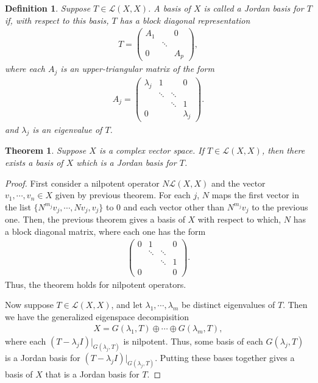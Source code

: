 \documentclass[10pt]{book}
\newtheorem{definition}{Definition}[chapter]
\newtheorem{theorem}{Theorem}[chapter]
\theoremstyle{definition}
\numberwithin{equation}{chapter}
\begin{document}
\medskip

\begin{definition}
Suppose $T\in\mathcal{L}(X,X)$. A basis of $X$ is called a Jordan basis for $T$ if, with respect to this basis, $T$ has a block diagonal representation
\begin{align*}
    T = \begin{pmatrix}
    A_1 &  & 0 \\
     & \ddots &  \\
    0 &  & A_p 
    \end{pmatrix},
\end{align*}
where each $A_j$ is an upper-triangular matrix of the form
\begin{align*}
    A_j = \begin{pmatrix}
    \lambda_j & 1 & & 0 \\
     & \ddots &  \ddots & \\
     &  & \ddots & 1 \\
    0 & & & \lambda_j
    \end{pmatrix}.
\end{align*}
and $\lambda_j$ is an eigenvalue of $T$.
\end{definition}

\medskip

\begin{theorem}
Suppose $X$ is a complex vector space. If $T\in\mathcal{L}(X,X)$, then there exists a basis of $X$ which is a Jordan basis for $T$.
\end{theorem}
\begin{proof}
First consider a nilpotent operator $N\mathcal{L}(X,X)$ and the vector $v_1,\cdots,v_n \in X$ given by previous theorem. For each $j$, $N$ maps the first vector in the list $\{N^{m_j}v_j, \cdots, Nv_j,v_j\}$ to $0$ and each vector other than $N^{m_j}v_j$ to the previous one. Then, the previous theorem gives a basis of $X$ with respect to which, $N$ has a block diagonal matrix, where each one has the form 
\begin{align*}
    \begin{pmatrix}
    0 & 1 & & 0 \\
     & \ddots &  \ddots & \\
     &  & \ddots & 1 \\
    0 & & & 0
    \end{pmatrix}.
\end{align*}
Thus, the theorem holds for nilpotent operators. 

Now suppose $T\in\mathcal{L}(X,X)$, and let $\lambda_1,\cdots,\lambda_m$ be distinct eigenvalues of $T$. Then we have the generalized eigenspace decompisition
\begin{align*}
    X = G(\lambda_1, T)\oplus \cdots \oplus G(\lambda_m, T),
\end{align*}
where each $(T-\lambda_j I)|_{G(\lambda_j, T)}$ is nilpotent. Thus, some basis of each $G(\lambda_j,T)$ is a Jordan basis for $(T-\lambda_j I)|_{G(\lambda_j, T)}$. Putting these bases together gives a basis of $X$ that is a Jordan basis for $T$.
\end{proof}
\end{document}
